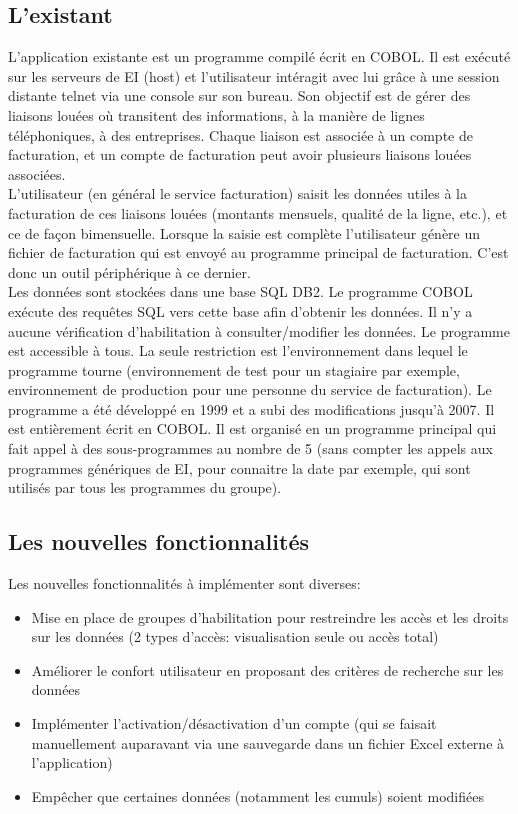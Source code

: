 \documentclass[a4paper,french,8pt]{article}
\begin{document}
	\subsection{L'existant}
	
		L’application existante est un programme compilé écrit en COBOL. Il est exécuté sur les serveurs de EI (host) et l’utilisateur intéragit avec lui grâce à une session distante telnet via une console sur son bureau.
		Son objectif est de gérer des liaisons louées où transitent des informations, à la manière de lignes téléphoniques, à des entreprises. 
		Chaque liaison est associée à un compte de facturation, et un compte de facturation peut avoir plusieurs liaisons louées associées. \\
		L’utilisateur (en général le service facturation) saisit les données utiles à la facturation de ces liaisons louées (montants mensuels, qualité de la ligne, etc.), et ce de façon bimensuelle. 
		Lorsque la saisie est complète l’utilisateur génère un fichier de facturation qui est envoyé au programme principal de facturation. C’est donc un outil périphérique à ce dernier. \\ 
		Les données sont stockées dans une base SQL DB2. Le programme COBOL exécute des requêtes SQL vers cette base afin d’obtenir les données.
		Il n’y a aucune vérification d’habilitation à consulter/modifier les données. Le programme est accessible à tous. La seule restriction est l’environnement dans lequel le programme tourne (environnement de test pour un stagiaire par exemple, environnement de production pour une personne du service de facturation).
		Le programme a été développé en 1999 et a subi des modifications jusqu’à 2007. Il est entièrement écrit en COBOL.
		Il est organisé en un programme principal qui fait appel à des sous-programmes au nombre de 5 (sans compter les appels aux programmes génériques de EI, pour connaitre la date par exemple, qui sont utilisés par tous les programmes du groupe). 
	

	\subsection{Les nouvelles fonctionnalités}
	
		Les nouvelles fonctionnalités à implémenter sont diverses:
		
		\begin{itemize}
			\item Mise en place de groupes d’habilitation pour restreindre les accès et les droits sur les données (2 types d'accès: visualisation seule ou accès total)
			\item Améliorer le confort utilisateur en proposant des critères de recherche sur les données
			\item Implémenter l’activation/désactivation d’un compte (qui se faisait manuellement auparavant via une sauvegarde dans un fichier Excel externe à l'application)
			\item Empêcher que certaines données (notamment les cumuls) soient modifiées
		\end{itemize}
		
\end{document}
